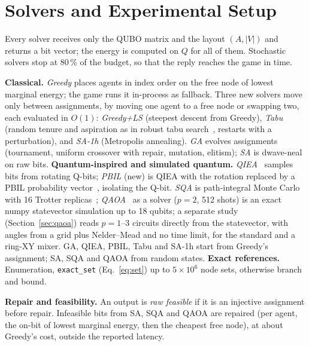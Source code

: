 \documentclass[sigconf]{acmart}
\begin{document}
\section{Solvers and Experimental Setup}\label{sec:setup}

Every solver receives only the QUBO matrix and the layout $(A,|V|)$ and returns a bit vector; the
energy is computed on $Q$ for all of them. Stochastic solvers stop at 80\,\% of the budget, so that
the reply reaches the game in time.

\textbf{Classical.} \emph{Greedy} places agents in index order on the free node of lowest marginal
energy; the game runs it in-process as fallback. Three new solvers move only between assignments,
by moving one agent to a free node or swapping two, each evaluated in $O(1)$: \emph{Greedy+LS}
(steepest descent from Greedy), \emph{Tabu} (random tenure and aspiration as in robust tabu
search~\cite{Taillard1991,Glover1989}, restarts with a perturbation), and \emph{SA-1h} (Metropolis
annealing). \emph{GA} evolves assignments (tournament, uniform crossover with repair, mutation,
elitism); \emph{SA} is dwave-neal~\cite{DWaveNeal,Kirkpatrick1983} on raw bits.
\textbf{Quantum-inspired and simulated quantum.} \emph{QIEA}~\cite{HanKim2002} samples bits from
rotating Q-bits; \emph{PBIL} (new) is QIEA with the rotation replaced by a PBIL probability
vector~\cite{Baluja1994}, isolating the Q-bit. \emph{SQA} is path-integral Monte Carlo with 16
Trotter replicas~\cite{Martonak2002}; \emph{QAOA}~\cite{Farhi2014} as a solver ($p=2$, 512 shots) is an exact
numpy statevector simulation up to 18 qubits; a separate study (Section~\ref{sec:qaoa}) reads
$p=1$--3 circuits directly from the statevector, with angles from a grid plus Nelder--Mead and no
time limit, for the standard and a ring-XY mixer. GA, QIEA, PBIL, Tabu and SA-1h start from Greedy's
assignment; SA, SQA and QAOA from random states.
\textbf{Exact references.} Enumeration, \texttt{exact\_set} (Eq.~\ref{eq:set}) up to
$5\times10^6$ node sets, otherwise branch and bound.

\textbf{Repair and feasibility.} An output is \emph{raw feasible} if it is an injective assignment
before repair. Infeasible bits from SA, SQA and QAOA are repaired (per agent, the on-bit of lowest
marginal energy, then the cheapest free node), at about Greedy's cost, outside the reported latency.
\end{document}
